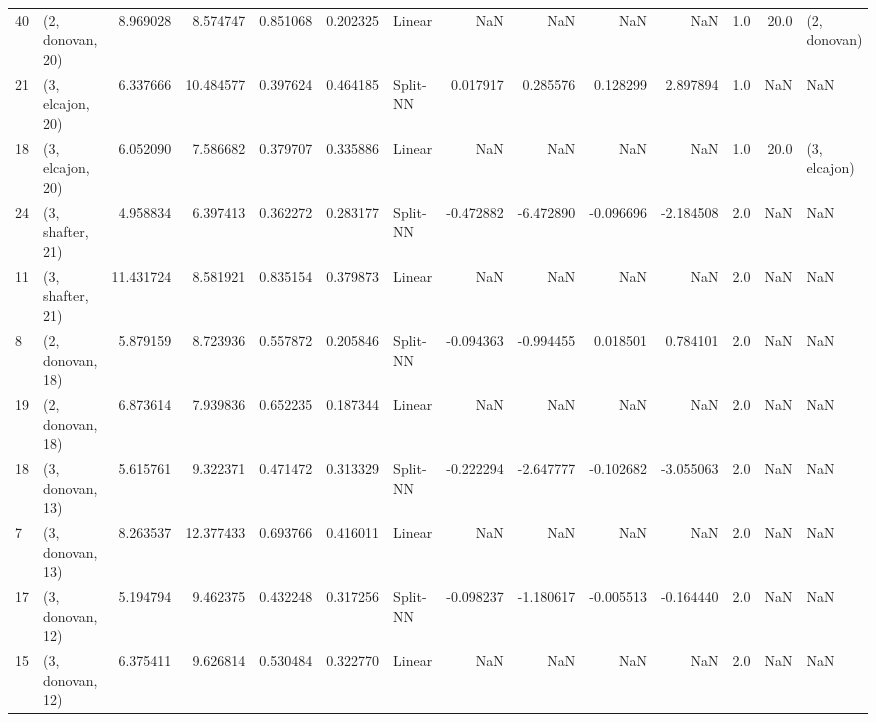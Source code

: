 \begin{tabular}{llrrrrlrrrrrrl}
40 &  (2, donovan, 20) &   8.969028 &   8.574747 &   0.851068 &  0.202325 &      Linear &             NaN &           NaN &            NaN &          NaN &            1.0 &   20.0 &     (2, donovan) \\
21 &  (3, elcajon, 20) &   6.337666 &  10.484577 &   0.397624 &  0.464185 &    Split-NN &        0.017917 &      0.285576 &       0.128299 &     2.897894 &            1.0 &    NaN &              NaN \\
18 &  (3, elcajon, 20) &   6.052090 &   7.586682 &   0.379707 &  0.335886 &      Linear &             NaN &           NaN &            NaN &          NaN &            1.0 &   20.0 &     (3, elcajon) \\
24 &  (3, shafter, 21) &   4.958834 &   6.397413 &   0.362272 &  0.283177 &    Split-NN &       -0.472882 &     -6.472890 &      -0.096696 &    -2.184508 &            2.0 &    NaN &              NaN \\
11 &  (3, shafter, 21) &  11.431724 &   8.581921 &   0.835154 &  0.379873 &      Linear &             NaN &           NaN &            NaN &          NaN &            2.0 &    NaN &              NaN \\
8  &  (2, donovan, 18) &   5.879159 &   8.723936 &   0.557872 &  0.205846 &    Split-NN &       -0.094363 &     -0.994455 &       0.018501 &     0.784101 &            2.0 &    NaN &              NaN \\
19 &  (2, donovan, 18) &   6.873614 &   7.939836 &   0.652235 &  0.187344 &      Linear &             NaN &           NaN &            NaN &          NaN &            2.0 &    NaN &              NaN \\
18 &  (3, donovan, 13) &   5.615761 &   9.322371 &   0.471472 &  0.313329 &    Split-NN &       -0.222294 &     -2.647777 &      -0.102682 &    -3.055063 &            2.0 &    NaN &              NaN \\
7  &  (3, donovan, 13) &   8.263537 &  12.377433 &   0.693766 &  0.416011 &      Linear &             NaN &           NaN &            NaN &          NaN &            2.0 &    NaN &              NaN \\
17 &  (3, donovan, 12) &   5.194794 &   9.462375 &   0.432248 &  0.317256 &    Split-NN &       -0.098237 &     -1.180617 &      -0.005513 &    -0.164440 &            2.0 &    NaN &              NaN \\
15 &  (3, donovan, 12) &   6.375411 &   9.626814 &   0.530484 &  0.322770 &      Linear &             NaN &           NaN &            NaN &          NaN &            2.0 &    NaN &              NaN \\

\end{tabular}
